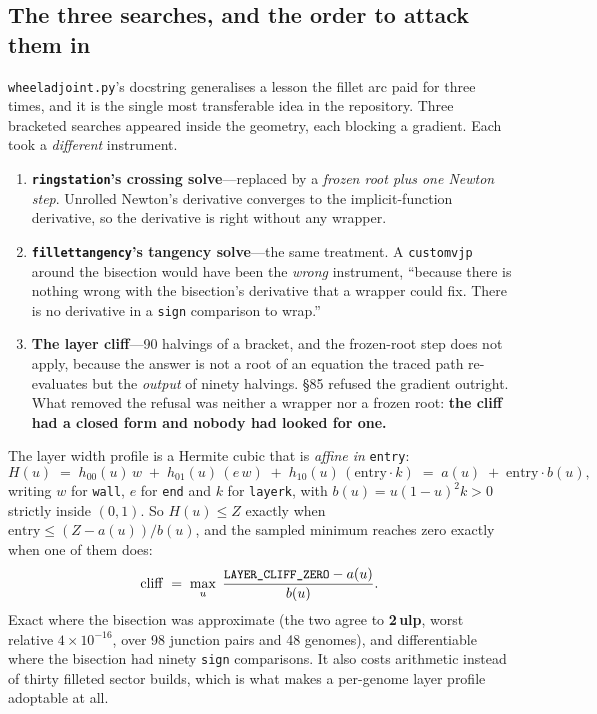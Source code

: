 \documentclass[11pt,a4paper]{article}
\DeclareRobustCommand{\code}[1]{%
  \texttt{\small\def\_{\textunderscore\discretionary{}{}{}}#1}}
\begin{document}
\subsection{The three searches, and the order to attack them in}
\label{sec:searches}

\code{wheel\_adjoint.py}'s docstring generalises a lesson the fillet arc paid for three
times, and it is the single most transferable idea in the repository. Three bracketed
searches appeared inside the geometry, each blocking a gradient. Each took a
\emph{different} instrument.

\begin{enumerate}
\item \textbf{\code{ring\_station}'s crossing solve}---replaced by a \emph{frozen root
  plus one Newton step}. Unrolled Newton's derivative converges to the
  implicit-function derivative, so the derivative is right without any wrapper.
\item \textbf{\code{\_fillet\_tangency}'s tangency solve}---the same treatment. A
  \code{custom\_vjp} around the bisection would have been the \emph{wrong} instrument,
  ``because there is nothing wrong with the bisection's derivative that a wrapper could
  fix. There is no derivative in a \code{sign} comparison to wrap.''
\item \textbf{The layer cliff}---90 halvings of a bracket, and the frozen-root step does
  not apply, because the answer is not a root of an equation the traced path
  re-evaluates but the \emph{output} of ninety halvings. \S85 refused the gradient
  outright. What removed the refusal was neither a wrapper nor a frozen root:
  \textbf{the cliff had a closed form and nobody had looked for one.}
\end{enumerate}

The layer width profile is a Hermite cubic that is \emph{affine in} \code{entry}:
%
\begin{equation}
  H(u) \;=\; h_{00}(u)\,w \;+\; h_{01}(u)\,(e\,w) \;+\; h_{10}(u)\,(\mathrm{entry}\cdot k)
       \;=\; a(u) \;+\; \mathrm{entry}\cdot b(u),
\end{equation}
%
writing $w$ for \code{wall}, $e$ for \code{end} and $k$ for \code{layer\_k}, with
$b(u) = u(1-u)^2 k > 0$ strictly inside $(0,1)$. So $H(u) \le Z$ exactly when
$\mathrm{entry} \le (Z - a(u))/b(u)$, and the sampled minimum reaches zero exactly when
one of them does:
%
\begin{equation}
  \mathrm{cliff} \;=\; \max_{u}\;\frac{\code{LAYER\_CLIFF\_ZERO} - a(u)}{b(u)}.
  \label{eq:cliff}
\end{equation}
%
Exact where the bisection was approximate (the two agree to \textbf{2\,ulp}, worst
relative $4\times10^{-16}$, over 98 junction pairs and 48 genomes), and differentiable
where the bisection had ninety \code{sign} comparisons. It also costs arithmetic instead
of thirty filleted sector builds, which is what makes a per-genome layer profile
adoptable at all.
\end{document}
